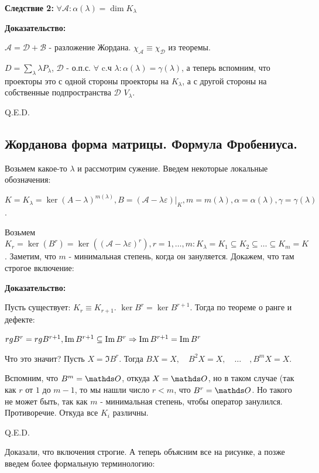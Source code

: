 \textbf{Следствие 2:} $\forall \mathcal{A} :\alpha(\lambda) = \dim K_{\lambda}$

\textbf{Доказательство:}

$\mathcal{A} = \mathcal{D} + \mathcal{B}$ - разложение Жордана. $\chi_{\mathcal{A}}\equiv \chi_{\mathcal{D}}$ из теоремы.

$D = \sum\limits_{\lambda}\lambda P_{\lambda}$, $\mathcal{D}$ - о.п.с. $\forall $ c.ч $\lambda: \alpha(\lambda) = \gamma(\lambda)$, а теперь вспомним, что проекторы это с одной стороны проекторы на $K_{\lambda}$, а с другой стороны на собственные подпространства $\mathcal{D}$ $V_{\lambda}$.

\hfill Q.E.D.

\pagebreak

\subsection{Жорданова форма матрицы. Формула Фробениуса. }

Возьмем какое-то $\lambda$ и рассмотрим сужение. Введем некоторые локальные обозначения:

$K=K_{\lambda} = \ker (A-\lambda)^{m(\lambda)},B = (\mathcal{A}-\lambda\varepsilon)\Big|_{K},m = m(\lambda),\alpha= \alpha(\lambda),\gamma=\gamma(\lambda)$.

Возьмем $K_r = \ker(B^r) = \ker((\mathcal{A}-\lambda\varepsilon)^r),r= 1,\ldots, m: K_\lambda = K_1 \subseteq K_2 \subseteq\ldots \subseteq K_m = K $. Заметим, что $m$ - минимальная степень, когда он зануляется. Докажем, что там строгое включение:

\textbf{Доказательство:}

Пусть существует: $K_r \equiv K_{r+1}$. $\ker B^r = \ker B^{r+1}$. Тогда по теореме о ранге и дефекте: 

$rg B^r = rg B^{r+1}, \operatorname{Im} B^{r+1} \subseteq \operatorname{Im} B^r\Rightarrow \operatorname{Im} B^{r+1} =\operatorname{Im} B^r $

Что это значит?  Пусть $X = \Im B^r$. Тогда $BX = X,\quad B^2X = X, \quad \ldots \quad, B^mX=X $.

Вспомним, что $B^m = \zero$, откуда $X = \zero$, но в таком случае (так как $r$ от $1$ до $m-1$, то мы нашли число $r<m$, что $B^r=\zero$. Но такого не может быть, так как $m$ - минимальная степень, чтобы оператор занулился. Противоречие. Откуда все $K_i$ различны.

\hfill Q.E.D.

Доказали, что включения строгие. А теперь объясним все на рисунке, а позже введем более формальную терминологию:

